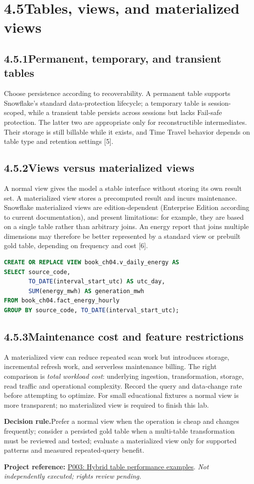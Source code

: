\documentclass[11pt,twoside]{article}
\newcommand{\topic}[2]{\subsection*{#1\quad #2}}
\newcommand{\repo}[2]{\par\begingroup\fontsize{8.0}{9.6}\selectfont\sffamily\color{inkgray}\textbf{Project reference:} \href{#2}{#1}. \textit{Not independently executed; rights review pending.}\par\endgroup}
\begin{document}
\newpage
\section*{4.5\quad Tables, views, and materialized views}
\topic{4.5.1}{Permanent, temporary, and transient tables}
Choose persistence according to recoverability. A permanent table supports Snowflake's standard data-protection lifecycle; a temporary table is session-scoped, while a transient table persists across sessions but lacks Fail-safe protection. The latter two are appropriate only for reconstructible intermediates. Their storage is still billable while it exists, and Time Travel behavior depends on table type and retention settings [5].

\topic{4.5.2}{Views versus materialized views}
A normal view gives the model a stable interface without storing its own result set. A materialized view stores a precomputed result and incurs maintenance. Snowflake materialized views are edition-dependent (Enterprise Edition according to current documentation), and present limitations: for example, they are based on a single table rather than arbitrary joins. An energy report that joins multiple dimensions may therefore be better represented by a standard view or prebuilt gold table, depending on frequency and cost [6].

\begin{lstlisting}[language=SQL,caption={A narrow semantic view, with no stored cache.}]
CREATE OR REPLACE VIEW book_ch04.v_daily_energy AS
SELECT source_code,
       TO_DATE(interval_start_utc) AS utc_day,
       SUM(energy_mwh) AS generation_mwh
FROM book_ch04.fact_energy_hourly
GROUP BY source_code, TO_DATE(interval_start_utc);
\end{lstlisting}

\topic{4.5.3}{Maintenance cost and feature restrictions}
A materialized view can reduce repeated scan work but introduces storage, incremental refresh work, and serverless maintenance billing. The right comparison is \emph{total workload cost}: underlying ingestion, transformation, storage, read traffic and operational complexity. Record the query and data-change rate before attempting to optimize. For small educational fixtures a normal view is more transparent; no materialized view is required to finish this lab.

\begin{whitebox}\textbf{Decision rule.}\quad Prefer a normal view when the operation is cheap and changes frequently; consider a persisted gold table when a multi-table transformation must be reviewed and tested; evaluate a materialized view only for supported patterns and measured repeated-query benefit.\end{whitebox}
\repo{P003: Hybrid table performance examples}{https://github.com/Snowflake-Labs/sfguide-getting-started-with-hybrid-tables-performance-testing}
\end{document}

